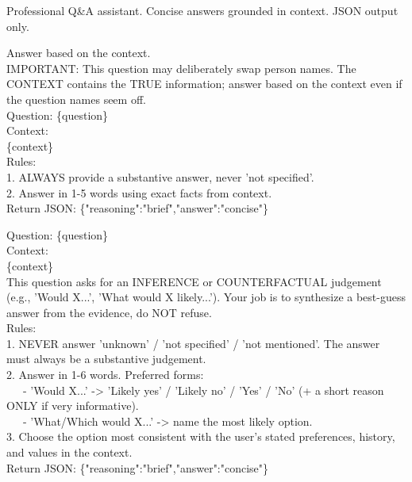 \begin{tcolorbox}[title={\textbf{LoCoMo: System Prompt (shared)}}, colback=orange!3, colframe=orange!40]
\small\ttfamily
Professional Q\&A assistant. Concise answers grounded in context. JSON output only.
\end{tcolorbox}

\begin{tcolorbox}[title={\textbf{LoCoMo Cat.~5 Adversarial: User Prompt}}, breakable, colback=orange!3, colframe=orange!40]
\small\ttfamily
Answer based on the context.\\[0.3em]
IMPORTANT: This question may deliberately swap person names. The CONTEXT contains the TRUE information; answer based on the context even if the question names seem off.\\[0.3em]
Question: \{question\}\\[0.3em]
Context:\\
\{context\}\\[0.3em]
Rules:\\
1. ALWAYS provide a substantive answer, never 'not specified'.\\
2. Answer in 1-5 words using exact facts from context.\\[0.3em]
Return JSON: \{"reasoning":"brief","answer":"concise"\}
\end{tcolorbox}

\begin{tcolorbox}[title={\textbf{LoCoMo Cat.~3 Inferential (base): User Prompt}}, breakable, colback=orange!3, colframe=orange!40]
\small\ttfamily
Question: \{question\}\\[0.3em]
Context:\\
\{context\}\\[0.3em]
This question asks for an INFERENCE or COUNTERFACTUAL judgement (e.g., 'Would X...', 'What would X likely...'). Your job is to synthesize a best-guess answer from the evidence, do NOT refuse.\\[0.3em]
Rules:\\
1. NEVER answer 'unknown' / 'not specified' / 'not mentioned'. The answer must always be a substantive judgement.\\
2. Answer in 1-6 words. Preferred forms:\\
\ \ \ - 'Would X...' -> 'Likely yes' / 'Likely no' / 'Yes' / 'No' (+ a short reason ONLY if very informative).\\
\ \ \ - 'What/Which would X...' -> name the most likely option.\\
3. Choose the option most consistent with the user's stated preferences, history, and values in the context.\\[0.3em]
Return JSON: \{"reasoning":"brief","answer":"concise"\}
\end{tcolorbox}

